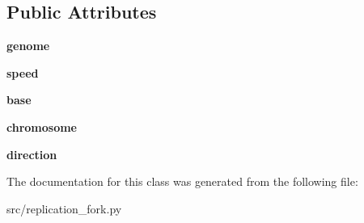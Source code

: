 \subsection*{Public Attributes}
\begin{DoxyCompactItemize}
\item 
\mbox{\label{classsrc_1_1replication__fork_1_1ReplicationFork_a56ed1556bbaff5f860483754a70130d1}} 
{\bfseries genome}
\item 
\mbox{\label{classsrc_1_1replication__fork_1_1ReplicationFork_a7f91fb265ed67fc7f257cff6a71bffd9}} 
{\bfseries speed}
\item 
\mbox{\label{classsrc_1_1replication__fork_1_1ReplicationFork_a906a9f61d787289cc43a6ad64a43364c}} 
{\bfseries base}
\item 
\mbox{\label{classsrc_1_1replication__fork_1_1ReplicationFork_a189ebc146334b456cea2a167f4ff08ba}} 
{\bfseries chromosome}
\item 
\mbox{\label{classsrc_1_1replication__fork_1_1ReplicationFork_a1db271766da726371a9e5bee2ecf4dbf}} 
{\bfseries direction}
\end{DoxyCompactItemize}


The documentation for this class was generated from the following file\+:\begin{DoxyCompactItemize}
\item 
src/replication\+\_\+fork.\+py\end{DoxyCompactItemize}
